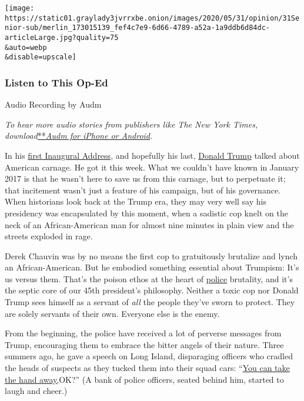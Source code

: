 \texttt{[image: https://static01.graylady3jvrrxbe.onion/images/2020/05/31/opinion/31Senior-sub/merlin\_173015139\_fef4c7e9-6d66-4789-a52a-1a9ddb6d84dc-articleLarge.jpg?quality=75\\\&auto=webp\\\&disable=upscale]}

\hypertarget{listen-to-this-op-ed}{%
\subsubsection{Listen to This Op-Ed}\label{listen-to-this-op-ed}}

Audio Recording by Audm

\emph{To hear more audio stories from publishers like The New York
Times,
download}\href{https://www.audm.com/?utm_source=nytmag\&utm_medium=embed\&utm_campaign=left_behind_draper}{**}\href{https://www.audm.com/?utm_source=nytopinion\&utm_medium=embed\&utm_campaign=trump_toxic_cops}{\emph{Audm
for iPhone or Android}}\emph{.}

In his
\href{https://www.nytimes3xbfgragh.onion/2017/01/20/us/politics/trump-resurrects-dark-definition-of-america-first-vision.html}{first
Inaugural Address}, and hopefully his last,
\href{https://www.nytimes3xbfgragh.onion/2020/06/12/us/politics/trump-police-chokeholds.html}{Donald
Trump} talked about American carnage. He got it this week. What we
couldn't have known in January 2017 is that he wasn't here to save us
from this carnage, but to perpetuate it; that incitement wasn't just a
feature of his campaign, but of his governance. When historians look
back at the Trump era, they may very well say his presidency was
encapsulated by this moment, when a sadistic cop knelt on the neck of an
African-American man for almost nine minutes in plain view and the
streets exploded in rage.

Derek Chauvin was by no means the first cop to gratuitously brutalize
and lynch an African-American. But he embodied something essential about
Trumpism: It's us versus them. That's the poison ethos at the heart of
\href{https://www.nytimes3xbfgragh.onion/2020/06/12/us/politics/trump-police-chokeholds.html}{police}
brutality, and it's the septic core of our 45th president's philosophy.
Neither a toxic cop nor Donald Trump sees himself as a servant of
\emph{all} the people they've sworn to protect. They are solely servants
of their own. Everyone else is the enemy.

From the beginning, the police have received a lot of perverse messages
from Trump, encouraging them to embrace the bitter angels of their
nature. Three summers ago, he gave a speech on Long Island, disparaging
officers who cradled the heads of suspects as they tucked them into
their squad cars:
``\href{https://www.washingtonpost.com/news/post-nation/wp/2017/07/28/trump-tells-police-not-to-worry-about-injuring-suspects-during-arrests/}{You
can take the hand away,}OK?'' (A bank of police officers, seated behind
him, started to laugh and cheer.)

